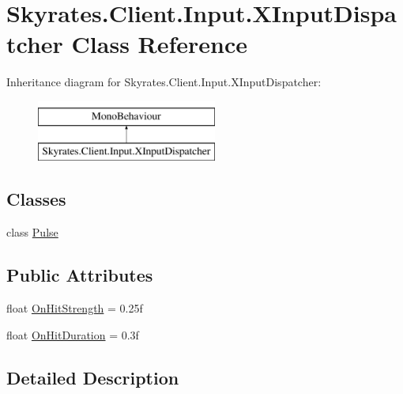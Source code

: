 \hypertarget{class_skyrates_1_1_client_1_1_input_1_1_x_input_dispatcher}{\section{Skyrates.\-Client.\-Input.\-X\-Input\-Dispatcher Class Reference}
\label{class_skyrates_1_1_client_1_1_input_1_1_x_input_dispatcher}
}


 


Inheritance diagram for Skyrates.\-Client.\-Input.\-X\-Input\-Dispatcher\-:\begin{figure}[H]
\begin{center}
\leavevmode
\includegraphics[height=2.000000cm]{class_skyrates_1_1_client_1_1_input_1_1_x_input_dispatcher}
\end{center}
\end{figure}
\subsection*{Classes}
\begin{DoxyCompactItemize}
\item 
class \hyperlink{class_skyrates_1_1_client_1_1_input_1_1_x_input_dispatcher_1_1_pulse}{Pulse}
\end{DoxyCompactItemize}
\subsection*{Public Attributes}
\begin{DoxyCompactItemize}
\item 
float \hyperlink{class_skyrates_1_1_client_1_1_input_1_1_x_input_dispatcher_a5f7cd1e18bea1cbd99c5df7dd27d4804}{On\-Hit\-Strength} = 0.\-25f
\item 
float \hyperlink{class_skyrates_1_1_client_1_1_input_1_1_x_input_dispatcher_aebb6a36b42b636002a2ea32d6096ec31}{On\-Hit\-Duration} = 0.\-3f
\end{DoxyCompactItemize}


\subsection{Detailed Description}




